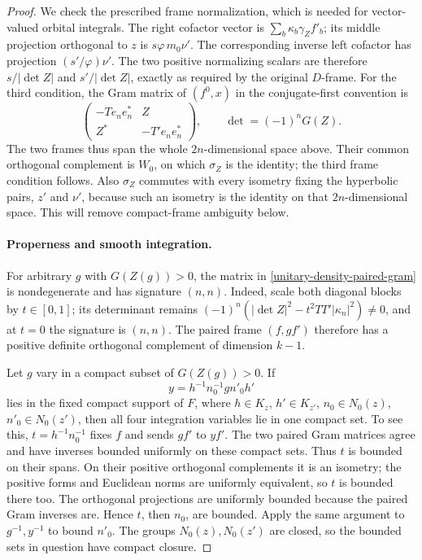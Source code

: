 \begin{proof}
We check the prescribed frame normalization, which is needed for
vector-valued orbital integrals.  The right cofactor vector is
$\sum_b\kappa_b\gamma_Z f'_b$; its middle projection orthogonal
to $z$ is $s\varphi\,m_0\nu'$.  The corresponding inverse left
cofactor has projection $(s'/\varphi)\nu'$.  The two positive
normalizing scalars are therefore $s/|\det Z|$ and
$s'/|\det Z|$, exactly as required by the original $D$-frame.
For the third condition, the Gram matrix of $(f^0,x)$ in the
conjugate-first convention is
\begin{equation}\label{unitary-density-paired-gram}
       \begin{pmatrix}-Te_ne_n^*&Z\\Z^*&-T'e_ne_n^*\end{pmatrix},
       \qquad \det=(-1)^nG(Z).
\end{equation}
The two frames thus span the whole $2n$-dimensional space above.
Their common orthogonal complement is $W_0$, on which $\sigma_Z$
is the identity; the third frame condition follows.  Also
$\sigma_Z$ commutes with every isometry fixing the hyperbolic
pairs, $z'$ and $\nu'$, because such an isometry is the identity
on that $2n$-dimensional space.  This will remove compact-frame
ambiguity below.

\paragraph{Properness and smooth integration.}
For arbitrary $g$ with $G(Z(g))>0$, the matrix in
\eqref{unitary-density-paired-gram} is nondegenerate and has
signature $(n,n)$.  Indeed, scale both diagonal blocks by
$t\in[0,1]$; its determinant remains
$(-1)^n(|\det Z|^2-t^2TT'|\kappa_n|^2)\ne0$, and at $t=0$
the signature is $(n,n)$.  The paired frame $(f,gf')$ therefore
has a positive definite orthogonal complement of dimension $k-1$.

Let $g$ vary in a compact subset of $G(Z(g))>0$.  If
\[
       y=h^{-1}n_0^{-1}g n'_0h'
\]
lies in the fixed compact support of $F$, where
$h\in K_z$, $h'\in K_{z'}$, $n_0\in N_0(z)$,
$n'_0\in N_0(z')$, then all four integration variables lie in
one compact set.  To see this, $t=h^{-1}n_0^{-1}$ fixes $f$
and sends $gf'$ to $yf'$.  The two paired Gram matrices agree
and have inverses bounded uniformly on these compact sets.
Thus $t$ is bounded on their spans.  On their positive
orthogonal complements it is an isometry; the positive forms
and Euclidean norms are uniformly equivalent, so $t$ is
bounded there too.  The orthogonal projections are uniformly
bounded because the paired Gram inverses are.  Hence $t$, then
$n_0$, are bounded.  Apply the same argument to $g^{-1},y^{-1}$
to bound $n'_0$.  The groups $N_0(z),N_0(z')$ are closed, so the
bounded sets in question have compact closure.


\end{proof}
